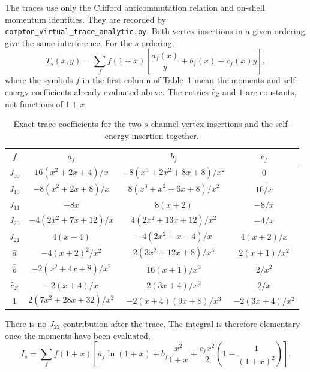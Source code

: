 The traces use only the Clifford anticommutation relation and
on-shell momentum identities. They are recorded by
\texttt{compton\_virtual\_trace\_analytic.py}. Both vertex insertions
in a given ordering give the same interference. For the $s$ ordering,
\begin{equation}
 T_s(x,y)=\sum_f f(1+x)
       \left[\frac{a_f(x)}y+b_f(x)+c_f(x)y\right],
\end{equation}
where the symbols $f$ in the first column of
Table~\ref{tab:comp-vt-angle-coefficients} mean the moments and
self-energy coefficients already evaluated above. The entries
$\widehat c_Z$ and $1$ are constants, not functions of $1+x$.
\begin{table}[!htbp]
\centering
\begin{tabular}{c|ccc}
$f$ & $a_f$ & $b_f$ & $c_f$\\
\hline
$J_{00}$ & $16(x^2+2x+4)/x$ & $-8(x^3+2x^2+8x+8)/x^2$ & $0$\\
$J_{10}$ & $-8(x^2+2x+8)/x$ & $8(x^3+x^2+6x+8)/x^2$ & $16/x$\\
$J_{11}$ & $-8x$ & $8(x+2)$ & $-8/x$\\
$J_{20}$ & $-4(2x^2+7x+12)/x$ & $4(2x^2+13x+12)/x^2$ & $-4/x$\\
$J_{21}$ & $4(x-4)$ & $-4(2x^2+x-4)/x$ & $4(x+2)/x$\\
$\widehat a$ & $-4(x+2)^2/x^2$ & $2(3x^2+12x+8)/x^3$ & $2(x+1)/x^2$\\
$\widehat b$ & $-2(x^2+4x+8)/x^2$ & $16(x+1)/x^3$ & $2/x^2$\\
$\widehat c_Z$ & $-2(x+4)/x$ & $2(3x+4)/x^2$ & $2/x$\\
$1$ & $2(7x^2+28x+32)/x^2$ & $-2(x+4)(9x+8)/x^3$ & $-2(3x+4)/x^2$\\
\end{tabular}
\caption{Exact trace coefficients for the two $s$-channel vertex
insertions and the self-energy insertion together.}
\label{tab:comp-vt-angle-coefficients}
\end{table}
There is no $J_{22}$ contribution after the trace. The integral is
therefore elementary once the moments have been evaluated,
\begin{equation}
 I_s=\sum_f f(1+x)\left[a_f\ln(1+x)
       +b_f\frac{x^2}{1+x}
       +\frac{c_f x^2}{2}\left(1-\frac1{(1+x)^2}\right)\right].
 \label{eq:comp-vt-s-angle}
\end{equation}

